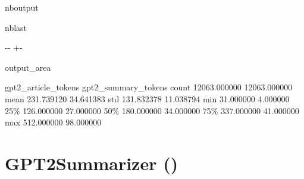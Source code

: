 \documentclass[letterpaper,10pt,english]{sphinxmanual}
\newlength\nbsphinxcodecellspacing
\begin{document}
\begin{sphinxuseclass}{nboutput}
\begin{sphinxuseclass}{nblast}
{

\kern-\sphinxverbatimsmallskipamount\kern-\baselineskip
\kern+\FrameHeightAdjust\kern-\fboxrule
\vspace{\nbsphinxcodecellspacing}

\begin{sphinxuseclass}{output_area}
\begin{sphinxuseclass}{}


\begin{sphinxVerbatim}[commandchars=\\\{\}]
\llap{\color{nbsphinxout}[90]:\,\hspace{\fboxrule}\hspace{\fboxsep}}       gpt2\_article\_tokens  gpt2\_summary\_tokens
count         12063.000000         12063.000000
mean            231.739120            34.641383
std             131.832378            11.038794
min              31.000000             4.000000
25\%             126.000000            27.000000
50\%             180.000000            34.000000
75\%             337.000000            41.000000
max             512.000000            98.000000
\end{sphinxVerbatim}



\end{sphinxuseclass}
\end{sphinxuseclass}
}

\end{sphinxuseclass}
\end{sphinxuseclass}

\chapter{GPT2Summarizer ()}
\label{\detokenize{code:module-gpt2_summarizer}}\label{\detokenize{code:gpt2summarizer-gpt2-summarizer-py}}\label{\detokenize{code::doc}}
\end{document}
